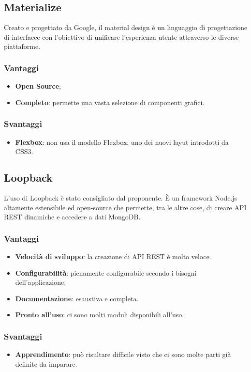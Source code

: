 \subsection{Materialize}
Creato e progettato da Google, il material design è un linguaggio di progettazione di interfacce con l'obiettivo di unificare l'esperienza utente attraverso le diverse piattaforme.
\subsubsection{Vantaggi}
\begin{itemize}
\item \textbf{Open Source};
\item \textbf{Completo}: permette una vasta selezione di componenti grafici.
\end{itemize}
\subsubsection{Svantaggi}
\begin{itemize}
\item \textbf{Flexbox}: non usa il modello Flexbox, uno dei nuovi layut introdotti da CSS3.
\end{itemize}
\subsection{Loopback}
L'uso di Loopback \`e stato consigliato dal proponente. \`E un framework Node.js altamente estensibile ed open-source che permette, tra le altre cose, di creare API REST dinamiche e accedere a dati MongoDB.
\subsubsection{Vantaggi}
\begin{itemize}
\item \textbf{Velocit\`a di sviluppo}: la creazione di API REST \`e molto veloce.
\item \textbf{Configurabilit\`a}: pienamente configurabile secondo i bisogni dell'applicazione.
\item \textbf{Documentazione}: esaustiva e completa.
\item \textbf{Pronto all'uso}: ci sono molti moduli disponibili all'uso.
\end{itemize}
\subsubsection{Svantaggi}
\begin{itemize}
\item \textbf{Apprendimento}: pu\`o risultare difficile visto che ci sono molte parti gi\`a definite da imparare.
\end{itemize}